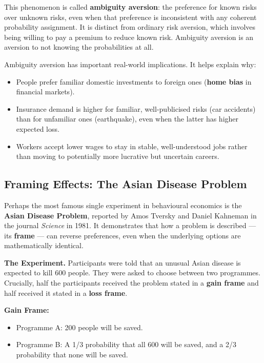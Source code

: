\documentclass[12pt, letterpaper]{article}
\begin{document}
This phenomenon is called \textbf{ambiguity aversion}: the preference for known risks over unknown risks, even when that preference is inconsistent with any coherent probability assignment. It is distinct from ordinary risk aversion, which involves being willing to pay a premium to reduce known risk. Ambiguity aversion is an aversion to not knowing the probabilities at all.

Ambiguity aversion has important real-world implications. It helps explain why:
\begin{itemize}
\item People prefer familiar domestic investments to foreign ones (\textbf{home bias} in financial markets).
\item Insurance demand is higher for familiar, well-publicised risks (car accidents) than for unfamiliar ones (earthquake), even when the latter has higher expected loss.
\item Workers accept lower wages to stay in stable, well-understood jobs rather than moving to potentially more lucrative but uncertain careers.
\end{itemize}

\medskip


\subsection{Framing Effects: The Asian Disease Problem}


Perhaps the most famous single experiment in behavioural economics is the \textbf{Asian Disease Problem}, reported by Amos Tversky and Daniel Kahneman in the journal \textit{Science} in 1981. It demonstrates that how a problem is described --- its \textbf{frame} --- can reverse preferences, even when the underlying options are mathematically identical.

\textbf{The Experiment.} Participants were told that an unusual Asian disease is expected to kill 600 people. They were asked to choose between two programmes. Crucially, half the participants received the problem stated in a \textbf{gain frame} and half received it stated in a \textbf{loss frame}.

\textbf{Gain Frame:}
\begin{itemize}
\item Programme A: 200 people will be saved.
\item Programme B: A 1/3 probability that all 600 will be saved, and a 2/3 probability that none will be saved.
\end{itemize}
\end{document}
